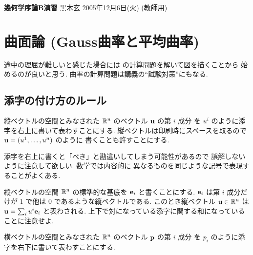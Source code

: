 \documentclass[12pt,twoside]{jarticle}
\newcommand\commentout[1]{#1}
\newcommand\commentout[1]{}
\begin{document}
\noindent
{\Large\bf 幾何学序論B演習}
\hfill
{\large 黒木玄}
\qquad
2005年12月6日(火)
\commentout{\quad (教師用)}
\tableofcontents

\section{曲面論 (Gauss曲率と平均曲率)}

途中の理屈が難しいと感じた場合には
の計算問題を解いて図を描くことから
始めるのが良いと思う. 曲率の計算問題は講義の``試験対策''にもなる.


\subsection{添字の付け方のルール}

縦ベクトルの空間とみなされた ${\mathbb R}^n$ のベクトル ${\mathbf u}$ の第 $i$ 成分
を $u^i$ のように添字を右上に書いて表わすことにする.
縦ベクトルは印刷時にスペースを取るので ${\mathbf u}=(u^1,\ldots,u^n)$ のように
書くことも許すことにする. 

添字を右上に書くと「べき」と勘違いしてしまう可能性があるので
誤解しないように注意して欲しい. 数学では内容的に
異なるものを同じような記号で表現することがよくある.

縦ベクトルの空間 ${\mathbb R}^n$ の標準的な基底を ${\mathbf e}_i$ と書くことにする.
${\mathbf e}_i$ は第 $i$ 成分だけが $1$ で他は $0$ であるような縦ベクトルである.
このとき縦ベクトル ${\mathbf u}\in{\mathbb R}^n$ は ${\mathbf u}=\sum_i u^i{\mathbf e}_i$ と表わされる.
上下で対になっている添字に関する和になっていることに注意せよ.

横ベクトルの空間とみなされた ${\mathbb R}^n$ のベクトル ${\mathbf p}$ の第 $i$ 成分
を $p_i$ のように添字を右下に書いて表わすことにする.
\end{document}
